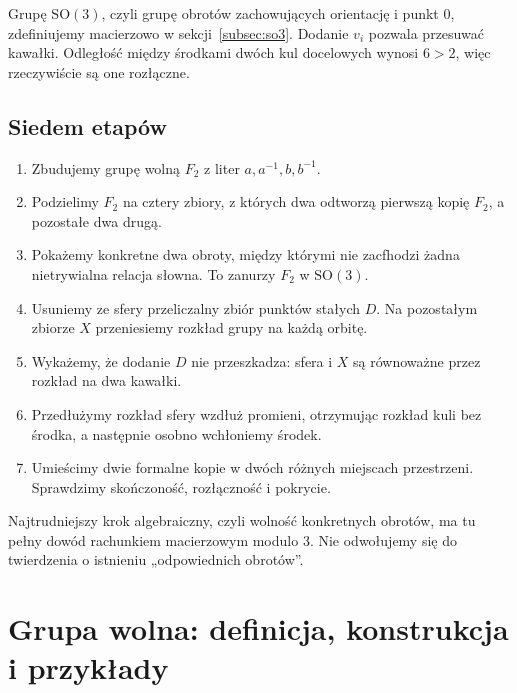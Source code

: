 \documentclass[11pt,a4paper]{article}
\numberwithin{equation}{section}
\theoremstyle{plain}
\theoremstyle{definition}
\theoremstyle{remark}
\begin{document}
Grupę $\mathrm{SO}(3)$, czyli grupę obrotów zachowujących orientację i punkt $0$, zdefiniujemy macierzowo w sekcji~\ref{subsec:so3}. Dodanie $v_i$ pozwala przesuwać kawałki. Odległość między środkami dwóch kul docelowych wynosi $6>2$, więc rzeczywiście są one rozłączne.

\subsection{Siedem etapów}
\begin{enumerate}
\item Zbudujemy grupę wolną $F_2$ z liter $a,a^{-1},b,b^{-1}$.
\item Podzielimy $F_2$ na cztery zbiory, z których dwa odtworzą pierwszą kopię $F_2$, a pozostałe dwa drugą.
\item Pokażemy konkretne dwa obroty, między którymi nie zacfhodzi żadna nietrywialna relacja słowna. To zanurzy $F_2$ w $\mathrm{SO}(3)$.
\item Usuniemy ze sfery przeliczalny zbiór punktów stałych $D$. Na pozostałym zbiorze $X$ przeniesiemy rozkład grupy na każdą orbitę.
\item Wykażemy, że dodanie $D$ nie przeszkadza: sfera i $X$ są równoważne przez rozkład na dwa kawałki.
\item Przedłużymy rozkład sfery wzdłuż promieni, otrzymując rozkład kuli bez środka, a następnie osobno wchłoniemy środek.
\item Umieścimy dwie formalne kopie w dwóch różnych miejscach przestrzeni. Sprawdzimy skończoność, rozłączność i pokrycie.
\end{enumerate}
Najtrudniejszy krok algebraiczny, czyli wolność konkretnych obrotów, ma tu pełny dowód rachunkiem macierzowym modulo $3$. Nie odwołujemy się do twierdzenia o istnieniu „odpowiednich obrotów”.

\section{Grupa wolna: definicja, konstrukcja i przykłady}
\end{document}
